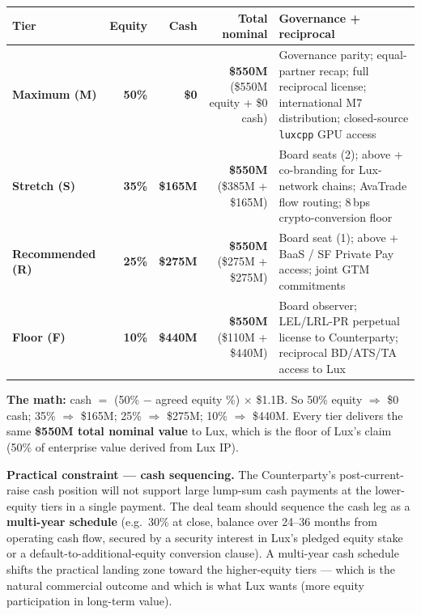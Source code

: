 \documentclass[11pt,letterpaper]{article}
\begin{document}
\begin{center}
\begin{small}
\begin{tabular}{p{1.9cm} r r r p{4.8cm}}
\toprule
\textbf{Tier} & \textbf{Equity} & \textbf{Cash} & \textbf{Total nominal} & \textbf{Governance + reciprocal} \\
\midrule
\textbf{Maximum (M)}    & \textbf{50\%} & \textbf{\$0}     & \textbf{\$550M} (\$550M equity + \$0 cash) & Governance parity; equal-partner recap; full reciprocal license; international M7 distribution; closed-source \texttt{luxcpp} GPU access \\
\textbf{Stretch (S)}    & \textbf{35\%} & \textbf{\$165M}  & \textbf{\$550M} (\$385M + \$165M) & Board seats (2); above + co-branding for Lux-network chains; AvaTrade flow routing; 8\,bps crypto-conversion floor \\
\textbf{Recommended (R)}& \textbf{25\%} & \textbf{\$275M}  & \textbf{\$550M} (\$275M + \$275M) & Board seat (1); above + BaaS / SF Private Pay access; joint GTM commitments \\
\textbf{Floor (F)}      & \textbf{10\%} & \textbf{\$440M}  & \textbf{\$550M} (\$110M + \$440M) & Board observer; LEL/LRL-PR perpetual license to Counterparty; reciprocal BD/ATS/TA access to Lux \\
\bottomrule
\end{tabular}
\end{small}
\end{center}

\textbf{The math:} cash $=$ (50\% $-$ agreed equity \%) $\times$
\$1.1B. So 50\% equity $\Rightarrow$ \$0 cash; 35\% $\Rightarrow$
\$165M; 25\% $\Rightarrow$ \$275M; 10\% $\Rightarrow$ \$440M. Every
tier delivers the same \textbf{\$550M total nominal value} to Lux,
which is the floor of Lux's claim (50\% of enterprise value derived
from Lux IP).

\textbf{Practical constraint --- cash sequencing.} The Counterparty's
post-current-raise cash position will not support large lump-sum cash
payments at the lower-equity tiers in a single payment. The deal team
should sequence the cash leg as a \textbf{multi-year schedule}
(e.g.\ 30\% at close, balance over 24--36 months from operating cash
flow, secured by a security interest in Lux's pledged equity stake or
a default-to-additional-equity conversion clause). A multi-year cash
schedule shifts the practical landing zone toward the higher-equity
tiers --- which is the natural commercial outcome and which is what
Lux wants (more equity participation in long-term value).
\end{document}
